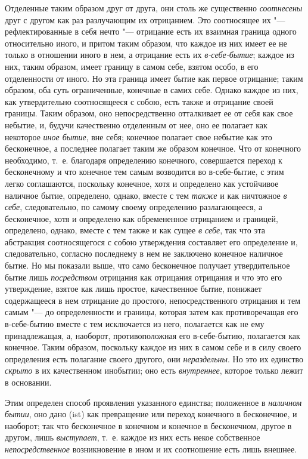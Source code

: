 Отделенные таким образом друг от друга, они столь же существенно
{\em соотнесены} друг с другом как раз разлучающим их
отрицанием. Это соотносящее их "--- рефлектированные в себя нечто "--- отрицание
есть их взаимная граница одного относительно иного, и притом таким
образом, что каждое из них имеет ее не только в отношении иного в нем, а
отрицание есть их {\em в-себе-бытие}; каждое из них,
таким образом, имеет границу в самом себе, взятом особо, в его отделенности
от иного. Но эта граница имеет бытие как первое отрицание; таким образом,
оба суть ограниченные, конечные в самих себе. Однако каждое из них, как
утвердительно соотносящееся с собою, есть также и отрицание своей границы.
Таким образом, оно непосредственно отталкивает ее от себя как свое небытие,
и, будучи качественно отделенным от нее, оно ее полагает как некоторое
{\em иное бытие}, вне себя; конечное полагает свое
небытие как это бесконечное, а последнее полагает таким же образом
конечное. Что от конечного необходимо, т.~е. благодаря определению
конечного, совершается переход к бесконечному и что конечное тем самым
возводится во в-себе-бытие, с этим легко соглашаются, поскольку конечное,
хотя и определено как устойчивое наличное бытие, определено, однако, вместе
с тем {\em также} и как ничтожное
{\em в себе}, следовательно, по самому своему
определению разлагающееся, а бесконечное, хотя и определено как
обремененное отрицанием и границей, определено, однако, вместе с тем также
и как сущее {\em в себе}, так что эта абстракция
соотносящегося с собою утверждения составляет его определение и,
следовательно, согласно последнему в нем не заключено конечное наличное
бытие. Но мы показали выше, что само бесконечное получает утвердительное
бытие лишь {\em посредством} отрицания как отрицания
отрицания и что это его утверждение, взятое как лишь простое, качественное
бытие, понижает содержащееся в нем отрицание до простого, непосредственного
отрицания и тем самым "--- до определенности и границы, которая затем как
противоречащая его в-себе-бытию вместе с тем исключается из него,
полагается как не ему принадлежащая, а, наоборот, противоположная его
в-себе-бытию, полагается как конечное. Таким образом, поскольку каждое из
них в самом себе и в силу своего определения есть полагание своего другого,
они {\em нераздельны}. Но это их единство
{\em скрыто} в их качественном инобытии; оно есть
{\em внутреннее}, которое только лежит в основании.

Этим определен способ проявления указанного единства; положенное в
{\em наличном бытии}, оно дано (ist) как превращение
или переход конечного в бесконечное, и наоборот; так что бесконечное в
конечном и конечное в бесконечном, другое в другом, лишь
{\em выступает}, т.~е. каждое из них есть некое
собственное {\em непосредственное} возникновение в
ином и их соотношение есть лишь внешнее.

